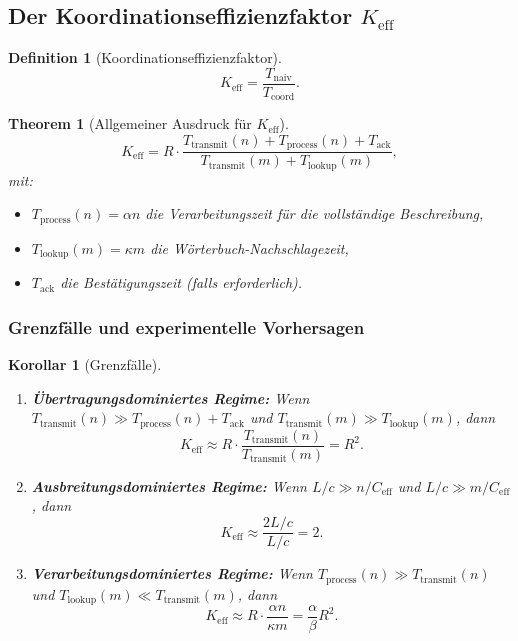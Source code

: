 \documentclass[11pt,a4paper]{article}
\newtheorem{theorem}{Theorem}
\newtheorem{definition}{Definition}
\newtheorem{corollary}{Korollar}
\begin{document}
	\subsection{Der Koordinationseffizienzfaktor $K_{\mathrm{eff}}$}
	
	\begin{definition}[Koordinationseffizienzfaktor]
		\[
		K_{\mathrm{eff}} = \frac{T_{\text{naiv}}}{T_{\text{coord}}}.
		\]
	\end{definition}
	
	\begin{theorem}[Allgemeiner Ausdruck für $K_{\mathrm{eff}}$]
		\label{thm:keff-expression}
		\[
		K_{\mathrm{eff}} = R \cdot \frac{T_{\text{transmit}}(n) + T_{\text{process}}(n) + T_{\text{ack}}}{T_{\text{transmit}}(m) + T_{\text{lookup}}(m)},
		\]
		mit:
		\begin{itemize}
			\item $T_{\text{process}}(n) = \alpha n$ die Verarbeitungszeit für die vollständige Beschreibung,
			\item $T_{\text{lookup}}(m) = \kappa m$ die Wörterbuch-Nachschlagezeit,
			\item $T_{\text{ack}}$ die Bestätigungszeit (falls erforderlich).
		\end{itemize}
	\end{theorem}
	
	\subsubsection{Grenzfälle und experimentelle Vorhersagen}
	
	\begin{corollary}[Grenzfälle]
		\begin{enumerate}
			\item \textbf{Übertragungsdominiertes Regime:} Wenn $T_{\text{transmit}}(n) \gg T_{\text{process}}(n) + T_{\text{ack}}$ und $T_{\text{transmit}}(m) \gg T_{\text{lookup}}(m)$, dann
			\[
			K_{\mathrm{eff}} \approx R \cdot \frac{T_{\text{transmit}}(n)}{T_{\text{transmit}}(m)} = R^2.
			\]
			
			\item \textbf{Ausbreitungsdominiertes Regime:} Wenn $L/c \gg n/C_{\text{eff}}$ und $L/c \gg m/C_{\text{eff}}$, dann
			\[
			K_{\mathrm{eff}} \approx \frac{2L/c}{L/c} = 2.
			\]
			
			\item \textbf{Verarbeitungsdominiertes Regime:} Wenn $T_{\text{process}}(n) \gg T_{\text{transmit}}(n)$ und $T_{\text{lookup}}(m) \ll T_{\text{transmit}}(m)$, dann
			\[
			K_{\mathrm{eff}} \approx R \cdot \frac{\alpha n}{\kappa m} = \frac{\alpha}{\beta} R^2.
			\]
		\end{enumerate}
	\end{corollary}
	
\end{document}
